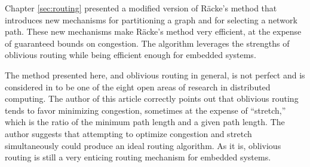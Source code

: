 Chapter \ref{sec:routing} presented a modified version of R\"acke's method that introduces new mechanisms for partitioning a graph and for selecting a network path. These new mechanisms make R\"acke's method very efficient, at the expense of guaranteed bounds on congestion. The algorithm leverages the strengths of oblivious routing while being efficient enough for embedded systems.

The method presented here, and oblivious routing in general, is not perfect and is considered in \cite{ref:2006-mavronicolas-eight_open_problems_in_distributed_computing} to be one of the eight open areas of research in distributed computing. The author of this article correctly points out that oblivious routing tends to favor minimizing congestion, sometimes at the expense of ``stretch,'' which is the ratio of the minimum path length and a given path length. The author suggests that attempting to optimize congestion and stretch simultaneously could produce an ideal routing algorithm. As it is, oblivious routing is still a very enticing routing mechanism for embedded systems.


